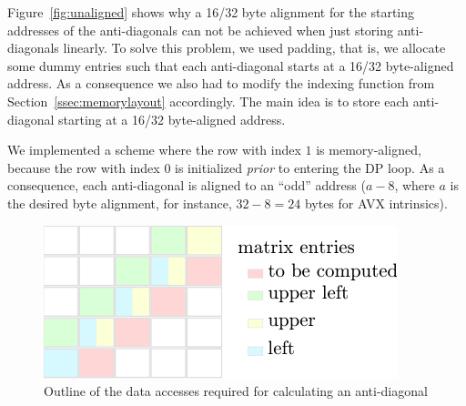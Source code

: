 \documentclass[runningheads,a4paper]{llncs}
\begin{document}
Figure~\ref{fig:unaligned} shows why a 16/32 byte alignment for the starting addresses of the anti-diagonals can not be achieved when just 
storing anti-diagonals linearly. To solve this problem, we used padding, that is, we allocate some dummy entries such that 
each anti-diagonal starts at a 16/32 byte-aligned address.
As a consequence we also had to modify the indexing function from Section~\ref{ssec:memorylayout} accordingly. 
The main idea is to store each anti-diagonal starting at a 16/32 byte-aligned address.  



We implemented a scheme where the row with index $1$ is memory-aligned, because the row with index $0$ is initialized {\em prior} to entering the DP loop. 
As a consequence, each anti-diagonal is aligned to an ``odd'' address ($a - 8$, where $a$ is the desired byte alignment, for instance, $32 - 8 = 24$ bytes for AVX intrinsics). 


\begin{figure}[ht!]
  \centering
  \includegraphics[scale=1.1]{figures/alignment.pdf}
  \caption{Outline of the data accesses required for calculating an anti-diagonal}
  \label{fig:alignment}
\end{figure}
\end{document}
